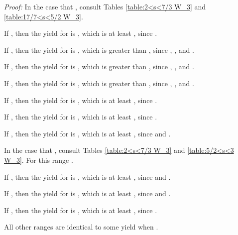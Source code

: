 \documentclass[11pt]{article}
\newcommand\QED{\ifhmode\allowbreak\else\nobreak\fi
\quad\nobreak\medbreak}
\newcommand{\proofstart}{\par\noindent \emph{Proof:} }
\newcommand{\proofend}{\QED\par}
\newenvironment{proof}{\proofstart}{\proofend}
\begin{document}
\begin{proof}
In the case that , consult Tables \ref{table:2<s<7/3 W_3} and \ref{table:17/7<s<5/2 W_3}.

If , then the yield for  is , which is at least , since .

If , then the yield for  is , which is greater than , since , , and .

If , then the yield for  is , which is greater than , since , , and .

If , then the yield for  is , which is greater than , since , , and .

If , then the yield for  is , which is at least , since  .

If , then the yield for  is , which is at least , since .

If , then the yield for  is , which is at least , since  and .

In the case that , consult Tables \ref{table:2<s<7/3 W_3} and \ref{table:5/2<s<3 W_3}.  For this range .

If , then the yield for  is , which is at least , since  and .

If , then the yield for  is , which is at least , since  and .

If , then the yield for  is , which is at least , since .

All other ranges are identical to some yield when .
\end{proof}
\end{document}
